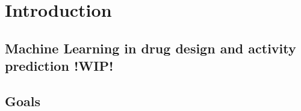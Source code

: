 \chapter{Introduction}\label{cha:Introduction}


\pagebreak

\section{Machine Learning in drug design and activity prediction !WIP!}


\section{Goals}



